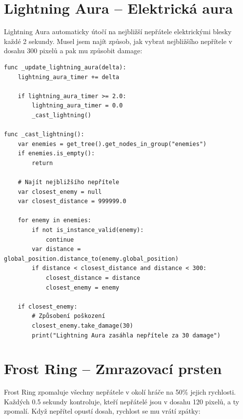 \documentclass[12pt, a4paper,
oneside
]{report}
\begin{document}
	\section{Lightning Aura -- Elektrická aura}
	\nopagebreak
	
	Lightning Aura automaticky útočí na nejbližší nepřátele elektrickými blesky každé 2 sekundy. Musel jsem najít způsob, jak vybrat nejbližšího nepřítele v dosahu 300 pixelů a pak mu způsobit damage:
	\nopagebreak
	
\begin{lstlisting}[style=GDScript, caption={Lightning Aura implementace}]
func _update_lightning_aura(delta):
	lightning_aura_timer += delta
	
	if lightning_aura_timer >= 2.0:
		lightning_aura_timer = 0.0
		_cast_lightning()

func _cast_lightning():
	var enemies = get_tree().get_nodes_in_group("enemies")
	if enemies.is_empty():
		return
	
	# Najít nejbližšího nepřítele
	var closest_enemy = null
	var closest_distance = 999999.0
	
	for enemy in enemies:
		if not is_instance_valid(enemy):
			continue
		var distance = global_position.distance_to(enemy.global_position)
		if distance < closest_distance and distance < 300:
			closest_distance = distance
			closest_enemy = enemy
	
	if closest_enemy:
		# Způsobení poškození
		closest_enemy.take_damage(30)
		print("Lightning Aura zasáhla nepřítele za 30 damage")
\end{lstlisting}

	\section{Frost Ring -- Zmrazovací prsten}
	\nopagebreak
	
	Frost Ring zpomaluje všechny nepřátele v okolí hráče na 50\% jejich rychlosti. Každých 0.5 sekundy kontroluje, kteří nepřátelé jsou v dosahu 120 pixelů, a ty zpomalí. Když nepřítel opustí dosah, rychlost se mu vrátí zpátky:
	\nopagebreak
	
\end{document}
